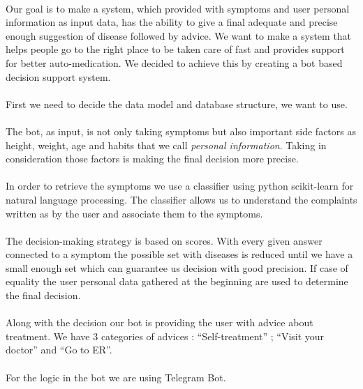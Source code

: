	\paragraph{} 
	Our goal is to make a system, which provided with symptoms and user personal information as input data, has the ability to give a final adequate and precise enough suggestion of disease followed by advice. We want to make a system that helps people go to the right place to be taken care of fast and provides support for better auto-medication.
	We decided to achieve this by creating a bot based decision support system.
	\paragraph{}
	First we need to decide the data model and database structure, we want to use.
	\paragraph{}
	The bot, as input, is not only taking symptoms but also important side factors as height, weight, age and habits that we call \textit{personal information}. Taking in consideration those factors is making the final decision more precise. 
	\paragraph{}
	In order to retrieve the symptoms we use a classifier using python scikit-learn for natural language processing. The classifier allows us to understand the complaints written as by the user and associate them to the symptoms.
	\paragraph{}
	The decision-making strategy is based on scores. With every given answer connected to a symptom the possible set with diseases is reduced until we have a small enough set which can guarantee us decision with good precision. If case of equality the user personal data gathered at the beginning are used to determine the final decision. 
	\paragraph{}
	Along with the decision our bot is providing the user with advice about treatment. We have 3 categories of advices :
	“Self-treatment” ; “Visit your doctor” and “Go to ER”. 
	\paragraph{}
	For the logic in the bot we are using Telegram Bot. 
	
	
	
	
	
	
	
	
	
	
	
	
	
	
  
